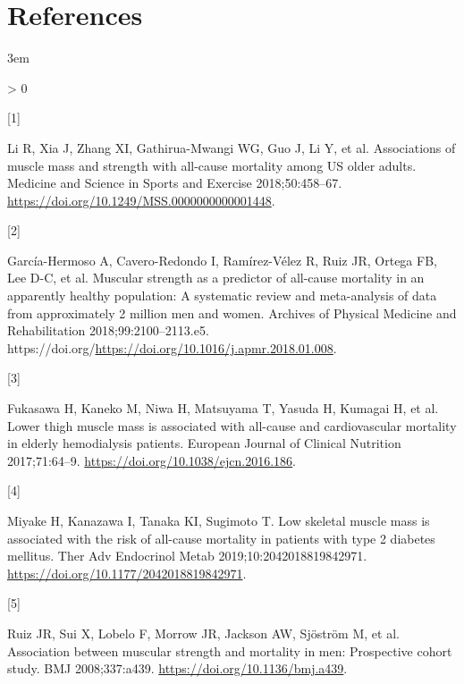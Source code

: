 \documentclass[twoside,10pt]{gihclass} %
\newlength{\cslhangindent}
\newlength{\csllabelwidth}
\newenvironment{CSLReferences}[3] %
 {%
  \setlength{\parindent}{0pt}
  \ifodd #1 \everypar{\setlength{\hangindent}{\cslhangindent}}\ignorespaces\fi
  \ifnum #2 > 0
  \setlength{\parskip}{#2\baselineskip}
  \fi
 }%
 {}
\newcommand{\CSLLeftMargin}[1]{\parbox[t]{\maxof{\widthof{#1}}{\csllabelwidth}}{#1}}
\newcommand{\CSLRightInline}[1]{\parbox[t]{\linewidth}{#1}}
\begin{document}
\backmatter

\hypertarget{references}{%
\chapter*{References}\label{references}}


\noindent

\setlength{\parskip}{4pt}

\rightskip3em

\footnotesize

\hypertarget{refs}{}
\begin{CSLReferences}{0}{0}
\leavevmode\hypertarget{ref-RN2512}{}%
\CSLLeftMargin{{[}1{]} }
\CSLRightInline{Li R, Xia J, Zhang XI, Gathirua-Mwangi WG, Guo J, Li Y, et al. Associations of muscle mass and strength with all-cause mortality among US older adults. Medicine and Science in Sports and Exercise 2018;50:458--67. \url{https://doi.org/10.1249/MSS.0000000000001448}.}

\leavevmode\hypertarget{ref-RN2808}{}%
\CSLLeftMargin{{[}2{]} }
\CSLRightInline{García-Hermoso A, Cavero-Redondo I, Ramírez-Vélez R, Ruiz JR, Ortega FB, Lee D-C, et al. Muscular strength as a predictor of all-cause mortality in an apparently healthy population: A systematic review and meta-analysis of data from approximately 2 million men and women. Archives of Physical Medicine and Rehabilitation 2018;99:2100--2113.e5. https://doi.org/\url{https://doi.org/10.1016/j.apmr.2018.01.008}.}

\leavevmode\hypertarget{ref-RN2513}{}%
\CSLLeftMargin{{[}3{]} }
\CSLRightInline{Fukasawa H, Kaneko M, Niwa H, Matsuyama T, Yasuda H, Kumagai H, et al. Lower thigh muscle mass is associated with all-cause and cardiovascular mortality in elderly hemodialysis patients. European Journal of Clinical Nutrition 2017;71:64--9. \url{https://doi.org/10.1038/ejcn.2016.186}.}

\leavevmode\hypertarget{ref-RN2514}{}%
\CSLLeftMargin{{[}4{]} }
\CSLRightInline{Miyake H, Kanazawa I, Tanaka KI, Sugimoto T. Low skeletal muscle mass is associated with the risk of all-cause mortality in patients with type 2 diabetes mellitus. Ther Adv Endocrinol Metab 2019;10:2042018819842971. \url{https://doi.org/10.1177/2042018819842971}.}

\leavevmode\hypertarget{ref-RN2809}{}%
\CSLLeftMargin{{[}5{]} }
\CSLRightInline{Ruiz JR, Sui X, Lobelo F, Morrow JR, Jackson AW, Sjöström M, et al. Association between muscular strength and mortality in men: Prospective cohort study. BMJ 2008;337:a439. \url{https://doi.org/10.1136/bmj.a439}.}


\end{CSLReferences}
\end{document}
